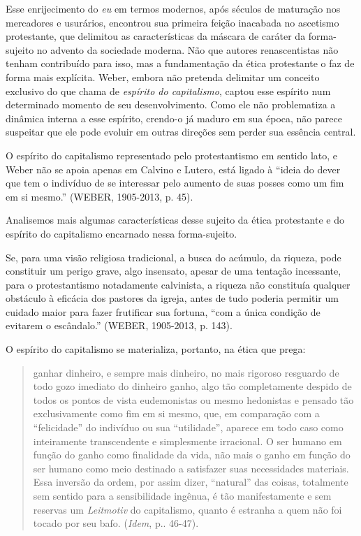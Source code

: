 Esse enrijecimento do \emph{eu} em termos modernos, após séculos de
maturação nos mercadores e usurários, encontrou sua primeira feição
inacabada no ascetismo protestante, que delimitou as características da
máscara de caráter da forma-sujeito no advento da sociedade moderna. Não
que autores renascentistas não tenham contribuído para isso, mas a
fundamentação da ética protestante o faz de forma mais explícita. Weber,
embora não pretenda delimitar um conceito exclusivo do que chama de
\emph{espírito do capitalismo}, captou esse espírito num determinado
momento de seu desenvolvimento. Como ele não problematiza a dinâmica
interna a esse espírito, crendo-o já maduro em sua época, não parece
suspeitar que ele pode evoluir em outras direções sem perder sua
essência central.

O espírito do capitalismo representado pelo protestantismo em sentido
lato, e Weber não se apoia apenas em Calvino e Lutero, está ligado à
``ideia do dever que tem o indivíduo de se interessar pelo aumento de
suas posses como um fim em si mesmo.'' (WEBER, 1905-2013, p. 45).

Analisemos mais algumas características desse sujeito da ética
protestante e do espírito do capitalismo encarnado nessa forma-sujeito.

Se, para uma visão religiosa tradicional, a busca do acúmulo, da
riqueza, pode constituir um perigo grave, algo insensato, apesar de uma
tentação incessante, para o protestantismo notadamente calvinista, a
riqueza não constituía qualquer obstáculo à eficácia dos pastores da
igreja, antes de tudo poderia permitir um cuidado maior para fazer
frutificar sua fortuna, ``com a única condição de evitarem o
escândalo.'' (WEBER, 1905-2013, p. 143).

O espírito do capitalismo se materializa, portanto, na ética que prega:

\begin{quote}
ganhar dinheiro, e sempre mais dinheiro, no mais rigoroso resguardo de
todo gozo imediato do dinheiro ganho, algo tão completamente despido de
todos os pontos de vista eudemonistas ou mesmo hedonistas e pensado tão
exclusivamente como fim em si mesmo, que, em comparação com a
``felicidade'' do indivíduo ou sua ``utilidade'', aparece em todo caso
como inteiramente transcendente e simplesmente irracional. O ser humano
em função do ganho como finalidade da vida, não mais o ganho em função
do ser humano como meio destinado a satisfazer suas necessidades
materiais. Essa inversão da ordem, por assim dizer, ``natural'' das
coisas, totalmente sem sentido para a sensibilidade ingênua, é tão
manifestamente e sem reservas um \emph{Leitmotiv} do capitalismo, quanto
é estranha a quem não foi tocado por seu bafo. (\emph{Idem}, p.. 46-47).
\end{quote}

